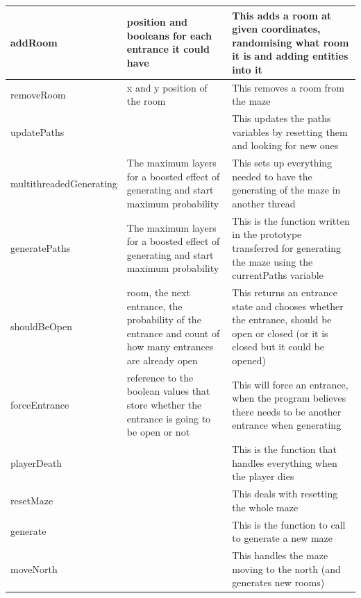 \documentclass{article}
\begin{document}
\begin{center}
\begin{tabular}{ | m{} | m{}| m{} | }
                        \hline
                        addRoom & position and booleans for each entrance it could have & This adds a room at given coordinates, randomising what room it is and adding entities into it \\
                        \hline
                        removeRoom & x and y position of the room & This removes a room from the maze \\
                        \hline
                        updatePaths & & This updates the paths variables by resetting them and looking for new ones \\
                        \hline
                        multithreadedGenerating & The maximum layers for a boosted effect of generating and start maximum probability & This sets up everything needed to have the generating of the maze in another thread \\
                        \hline
                        generatePaths &  The maximum layers for a boosted effect of generating and start maximum probability & This is the function written in the prototype transferred for generating the maze using the currentPaths variable \\
                        \hline
                        shouldBeOpen & room, the next entrance, the probability of the entrance and count of how many entrances are already open & This returns an entrance state and chooses whether the entrance, should be open or closed (or it is closed but it could be opened)\\
                        \hline
                        forceEntrance & reference to the boolean values that store whether the entrance is going to be open or not & This will force an entrance, when the program believes there needs to be another entrance when generating \\
                        \hline
                        playerDeath & & This is the function that handles everything when the player dies \\
                        \hline
                        resetMaze & & This deals with resetting the whole maze \\
                        \hline
                        generate & & This is the function to call to generate a new maze \\
                        \hline
                        moveNorth & & This handles the maze moving to the north (and generates new rooms)\\
                        \hline

\end{tabular}
\end{center}
\end{document}
